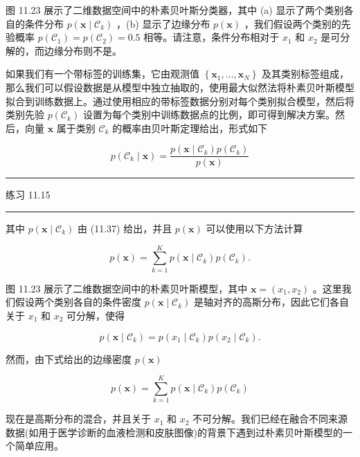 \documentclass[10pt]{article}
\newcommand{\HRule}{\begin{center}\rule{0.9\linewidth}{0.2mm}\end{center}}
\begin{document}
图 11.23 展示了二维数据空间中的朴素贝叶斯分类器，其中 (a) 显示了两个类别各自的条件分布 \(p\left( {\mathbf{x} \mid  {\mathcal{C}}_{k}}\right)\) ，(b) 显示了边缘分布 \(p\left( \mathbf{x}\right)\) ，我们假设两个类别的先验概率 \(p\left( {\mathcal{C}}_{1}\right)  = p\left( {\mathcal{C}}_{2}\right)  = {0.5}\) 相等。请注意，条件分布相对于 \({x}_{1}\) 和 \({x}_{2}\) 是可分解的，而边缘分布则不是。

如果我们有一个带标签的训练集，它由观测值 \(\left\{  {{\mathbf{x}}_{1},\ldots ,{\mathbf{x}}_{N}}\right\}\) 及其类别标签组成，那么我们可以假设数据是从模型中独立抽取的，使用最大似然法将朴素贝叶斯模型拟合到训练数据上。通过使用相应的带标签数据分别对每个类别拟合模型，然后将类别先验 \(p\left( {\mathcal{C}}_{k}\right)\) 设置为每个类别中训练数据点的比例，即可得到解决方案。然后，向量 \(\mathbf{x}\) 属于类别 \({\mathcal{C}}_{k}\) 的概率由贝叶斯定理给出，形式如下

\[
p\left( {{\mathcal{C}}_{k} \mid  \mathbf{x}}\right)  = \frac{p\left( {\mathbf{x} \mid  {\mathcal{C}}_{k}}\right) p\left( {\mathcal{C}}_{k}\right) }{p\left( \mathbf{x}\right) } \tag{11.38}
\]

\HRule

练习 11.15

\HRule

其中 \(p\left( {\mathbf{x} \mid  {\mathcal{C}}_{k}}\right)\) 由 (11.37) 给出，并且 \(p\left( \mathbf{x}\right)\) 可以使用以下方法计算

\[
p\left( \mathbf{x}\right)  = \mathop{\sum }\limits_{{k = 1}}^{K}p\left( {\mathbf{x} \mid  {\mathcal{C}}_{k}}\right) p\left( {\mathcal{C}}_{k}\right) . \tag{11.39}
\]

图 11.23 展示了二维数据空间中的朴素贝叶斯模型，其中 \(\mathbf{x} = \left( {{x}_{1},{x}_{2}}\right)\) 。这里我们假设两个类别各自的条件密度 \(p\left( {\mathbf{x} \mid  {\mathcal{C}}_{k}}\right)\) 是轴对齐的高斯分布，因此它们各自关于 \({x}_{1}\) 和 \({x}_{2}\) 可分解，使得

\[
p\left( {\mathbf{x} \mid  {\mathcal{C}}_{k}}\right)  = p\left( {{x}_{1} \mid  {\mathcal{C}}_{k}}\right) p\left( {{x}_{2} \mid  {\mathcal{C}}_{k}}\right) . \tag{11.40}
\]

然而，由下式给出的边缘密度 \(p\left( \mathbf{x}\right)\)

\[
p\left( \mathbf{x}\right)  = \mathop{\sum }\limits_{{k = 1}}^{K}p\left( {\mathbf{x} \mid  {\mathcal{C}}_{k}}\right) p\left( {\mathcal{C}}_{k}\right)  \tag{11.41}
\]

现在是高斯分布的混合，并且关于 \({x}_{1}\) 和 \({x}_{2}\) 不可分解。我们已经在融合不同来源数据(如用于医学诊断的血液检测和皮肤图像)的背景下遇到过朴素贝叶斯模型的一个简单应用。
\end{document}
